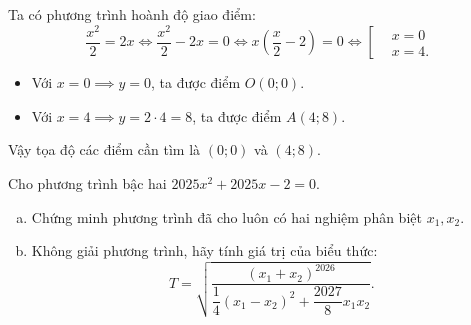 \begin{bt}
{\begin{enumerate}[a)]
	Ta có phương trình hoành độ giao điểm:
	$$\dfrac{x^2}{2} = 2x \iff \dfrac{x^2}{2} - 2x = 0 \iff x\left(\dfrac{x}{2} - 2\right) = 0 \iff \left[\begin{aligned} &x = 0 \\ &x = 4. \end{aligned}\right.$$
	\begin{itemize}
		\item Với $x = 0 \implies y = 0$, ta được điểm $O(0; 0)$.
		\item Với $x = 4 \implies y = 2 \cdot 4 = 8$, ta được điểm $A(4; 8)$.
	\end{itemize}
	Vậy tọa độ các điểm cần tìm là $(0; 0)$ và $(4; 8)$.
\end{enumerate}
}
\end{bt}

\begin{bt}%
Cho phương trình bậc hai $2025x^2 + 2025x - 2 = 0$.
\begin{enumerate}[a)]
	\item Chứng minh phương trình đã cho luôn có hai nghiệm phân biệt $x_1, x_2$.
	\item Không giải phương trình, hãy tính giá trị của biểu thức:
	$$T = \sqrt{\dfrac{(x_1 + x_2)^{2026}}{\dfrac{1}{4}(x_1 - x_2)^2 + \dfrac{2027}{8}x_1 x_2}}.$$
\end{enumerate}
\end{bt}
